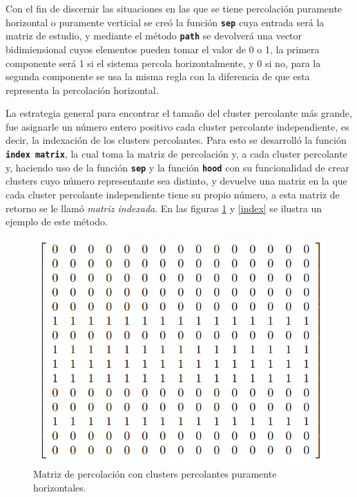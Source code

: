 \documentclass[11pt,twocolumn]{article}
\begin{document}
Con el fin de discernir las situaciones en las que se tiene percolación puramente horizontal o puramente verticial se creó la función \texttt{\textbf{sep}} cuya entrada será la matriz de estudio, y mediante el método \texttt{\textbf{path}} se devolverá una vector bidimiensional cuyos elementos pueden tomar el valor de 0 o 1, la primera componente será 1 si el sistema percola horizontalmente, y 0 si no, para la segunda componente se usa la misma regla con la diferencia de que esta representa la percolación horizontal.
\vspace{0.2 cm}

La estrategia general para encontrar el tamaño del cluster percolante más grande, fue asignarle un número entero positivo cada cluster percolante independiente, es decir, la indexación de los clusters percolantes. Para esto se desarrolló la función \texttt{\textbf{index matrix}}, la cual toma la matriz de percolación y, a cada cluster percolante y, haciendo uso de la función \texttt{\textbf{sep}} y la función \texttt{\textbf{hood}} con su funcionalidad de crear clusters cuyo número representante sea distinto, y devuelve una matriz en la que cada cluster percolante independiente tiene su propio número, a esta matriz de retorno se le llamó \textit{matriz indexada}. En las figuras \ref{matrix} y \ref{index} se ilustra un ejemplo de este método.
 \begin{figure}[H]
    \centering
    \includegraphics[scale=0.4]{Imagenes/matriz3.png}
    \caption{Matriz de percolación con clusters percolantes puramente horizontales.}
    \label{matrix}
\end{figure}
\end{document}
